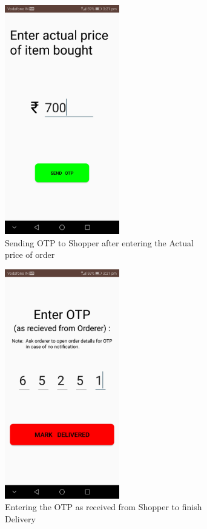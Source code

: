 \documentclass{report}
\begin{document}
\begin{figure}[h!]
\begin{subfigure}[h!]{.3\textwidth}
\centering
\includegraphics[width=5cm]{send_otp.jpg}
\caption{\centering \tiny Sending OTP to Shopper after entering the Actual price of order}
\end{subfigure}
\begin{subfigure}[h!]{.3\textwidth}
\centering
\includegraphics[width=5cm]{mark_delivered.jpg}
\caption{\centering \tiny Entering the OTP as received from Shopper to finish Delivery}
\end{subfigure}
\begin{subfigure}[h!]{.3\textwidth}
\centering

\end{subfigure}
\end{figure}
\end{document}
